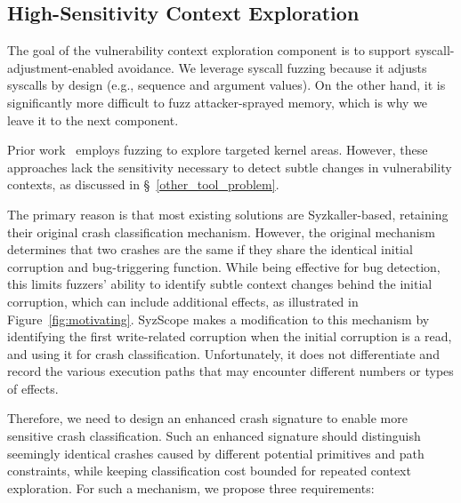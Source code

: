 

\subsection{High-Sensitivity Context Exploration}
\label{sec:context_exploration}

The goal of the vulnerability context exploration component is to support syscall-adjustment-enabled avoidance. We leverage syscall fuzzing because it adjusts syscalls by design (e.g., sequence and argument values). On the other hand, it is significantly more difficult to fuzz attacker-sprayed memory, which is why we leave it to the next component.

Prior work~\cite{lin2022grebe,zou2022syzscope,tan2023syzdirect,harbianqa,yome} employs fuzzing to explore targeted kernel areas. However, these approaches lack the sensitivity necessary to detect subtle changes in vulnerability contexts, as discussed in \S~\ref{other_tool_problem}. 

The primary reason is that most existing solutions are Syzkaller-based, retaining their original crash classification mechanism. However, the original mechanism determines that two crashes are the same if they share the identical initial corruption and bug-triggering function. While being effective for bug detection, this limits fuzzers' ability to identify subtle context changes behind the initial corruption, which can include additional effects, as illustrated in Figure~\ref{fig:motivating}. SyzScope makes a modification to this mechanism by identifying the first write-related corruption when the initial corruption is a read, and using it for crash classification. Unfortunately, it does not differentiate and record the various execution paths that may encounter different numbers or types of effects.

Therefore, we need to design an enhanced crash signature to enable more sensitive crash classification. Such an enhanced signature should distinguish seemingly identical crashes caused by different potential primitives and path constraints, while keeping classification cost bounded for repeated context exploration. For such a mechanism, we propose three requirements: %

